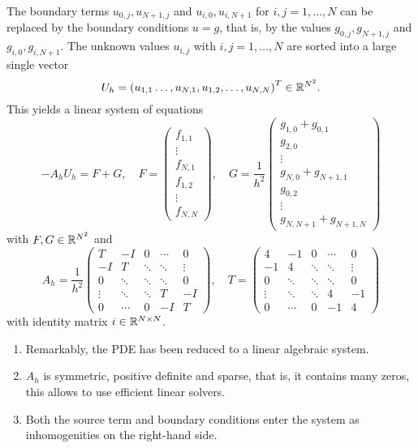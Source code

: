 The boundary terms \(u_{0, j}, u_{N + 1, j}\) and \(u_{i, 0}, u_{i, N + 1}\) for \(i, j = 1, \ldots, N\) can be replaced by the boundary conditions \(u = g\), that is, by the values \(g_{0, j}, g_{N + 1, j}\) and \(g_{i, 0}, g_{i, N + 1}\).
The unknown values \(u_{i, j}\) with \(i, j = 1, \ldots, N\) are sorted into a large single vector
\[
	U_h = \parentheses*{u_{1, 1} \ldots, u_{N, 1}, u_{1, 2}, \ldots, u_{N, N}}^T \in \R^{N^2}.
\]
This yields a linear system of equations
\[
	-A_h U_h = F + G, \quad F = \begin{pmatrix}
		f_{1, 1}\\
		\vdots\\
		f_{N, 1}\\
		f_{1, 2}\\
		\vdots\\
		f_{N, N}
	\end{pmatrix}, \quad G = \frac{1}{h^2}\begin{pmatrix}
		g_{1, 0} + g_{0, 1}\\
		g_{2, 0}\\
		\vdots\\
		g_{N, 0} + g_{N + 1, 1}\\
		g_{0, 2}\\
		\vdots\\
		g_{N, N + 1} + g_{N + 1, N}
	\end{pmatrix}
\]
with \(F, G \in \R^{N^2}\) and
\[
	A_h = \frac{1}{h^2}\begin{pmatrix}
		T & -I & 0 & \cdots & 0\\
		-I & T & \ddots & \ddots & \vdots\\
		0 & \ddots & \ddots & \ddots & 0\\
		\vdots & \ddots & \ddots & T & -I\\
		0 & \cdots & 0 & -I & T
	\end{pmatrix}, \quad T = \begin{pmatrix}
		4 & -1 & 0 & \cdots & 0\\
		-1 & 4 & \ddots & \ddots & \vdots\\
		0 & \ddots & \ddots & \ddots & 0\\
		\vdots & \ddots & \ddots & 4 & -1\\
		0 & \cdots & 0 & -1 & 4
	\end{pmatrix}
\]
with identity matrix \(i \in \R^{N \times N}\).

\begin{remark}
	\begin{enumerate}
		\item Remarkably, the PDE has been reduced to a linear algebraic system.
		\item \(A_h\) is symmetric, positive definite and sparse, that is, it contains many zeros, this allows to use efficient linear solvers.
		\item Both the source term and boundary conditions enter the system as inhomogenities on the right-hand side.
	\end{enumerate}
\end{remark}


